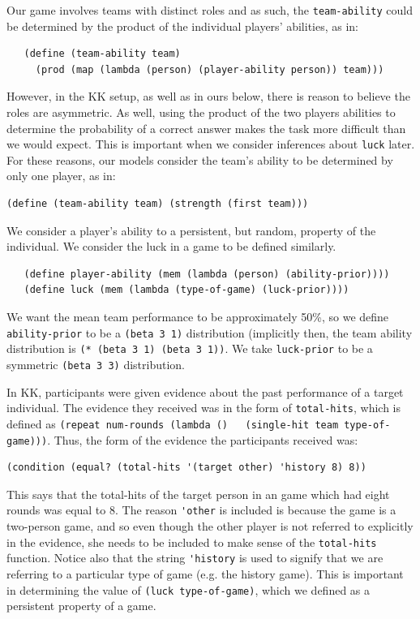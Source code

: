 \documentclass{article}
\begin{document}
Our game involves teams with distinct roles and as such, the \lstinline{team-ability} could be determined by the product of the individual players' abilities, as in:

\begin{lstlisting}
   (define (team-ability team)
     (prod (map (lambda (person) (player-ability person)) team)))
\end{lstlisting}

However, in the KK setup, as well as in ours below, there is reason to believe the roles are asymmetric. As well, using the product of the two players abilities to determine the probability of a correct answer makes the task more difficult than we would expect. This is important when we consider inferences about \lstinline{luck} later. For these reasons, our models consider the team's ability to be determined by only one player, as in:

\begin{lstlisting}
(define (team-ability team) (strength (first team)))
\end{lstlisting}

We consider a player's ability to a persistent, but random, property of the individual. We consider the luck in a game to be defined similarly. 

\begin{lstlisting}
   (define player-ability (mem (lambda (person) (ability-prior))))
   (define luck (mem (lambda (type-of-game) (luck-prior))))
\end{lstlisting}

We want the mean team performance to be approximately 50\%, so we define \lstinline{ability-prior} to be a \lstinline{(beta 3 1)} distribution (implicitly then, the team ability distribution is \lstinline{(* (beta 3 1) (beta 3 1))}. We take \lstinline{luck-prior} to be a symmetric \lstinline{(beta 3 3)} distribution. 

In KK, participants were given evidence about the past performance of a target individual. The evidence they received was in the form of \lstinline{total-hits}, which is defined as \lstinline{(repeat num-rounds (lambda ()   (single-hit team type-of-game)))}. Thus, the form of the evidence the participants received was:


\begin{lstlisting}
(condition (equal? (total-hits '(target other) 'history 8) 8))
\end{lstlisting}

This says that the total-hits of the target person in an game which had eight rounds was equal to 8. The reason \lstinline{'other} is included is because the game is a two-person game, and so even though the other player is not referred to explicitly in the evidence, she needs to be included to make sense of the \lstinline{total-hits} function. Notice also that the string \lstinline{'history} is used to signify that we are referring to a particular type of game (e.g. the history game). This is important in determining the value of \lstinline{(luck type-of-game)}, which we defined as a persistent property of a game.
\end{document}
